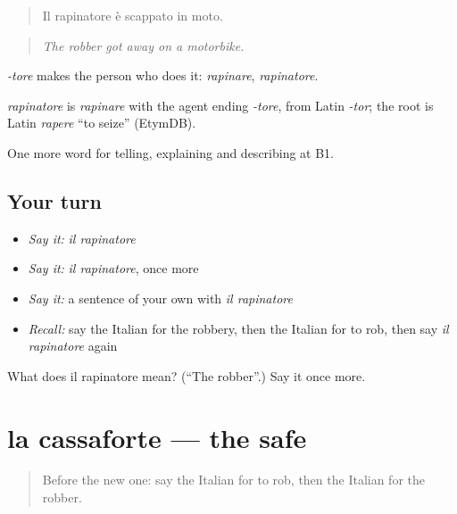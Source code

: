 \begin{quote}
Il rapinatore è scappato in moto.
\end{quote}

\begin{quote}
\emph{The robber got away on a motorbike.}
\end{quote}

\emph{-tore} makes the person who does it: \emph{rapinare}, \emph{rapinatore}.

\begin{cousinweb}
\emph{rapinatore} is \emph{rapinare} with the agent ending \emph{-tore}, from Latin \emph{-tor}; the root is Latin \emph{rapere} \textquotedblleft{}to seize\textquotedblright{} (EtymDB).
\end{cousinweb}

\begin{grammarlens}[title={What you've built}]
One more word for telling, explaining and describing at B1.
\end{grammarlens}

\subsection*{Your turn}
\begin{itemize}
\raggedright
  \item \emph{Say it:} \emph{il rapinatore}
  \item \emph{Say it:} \emph{il rapinatore}, once more
  \item \emph{Say it:} a sentence of your own with \emph{il rapinatore}
  \item \emph{Recall:} say the Italian for the robbery, then the Italian for to rob, then say \emph{il rapinatore} again
\end{itemize}

\begin{tcolorbox}[breakable,colback=teal!4,colframe=teal!35!black,title={Before you move on}]
What does il rapinatore mean? (\textquotedblleft{}The robber\textquotedblright{}.) Say it once more.
\end{tcolorbox}
\section[la cassaforte]{la cassaforte — the safe}

\label{lesson:IT-C292-cassaforte}



\begin{quote}
Before the new one: say the Italian for to rob, then the Italian for the robber.
\end{quote}

